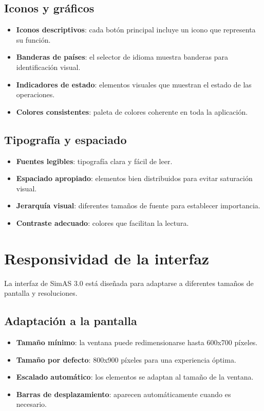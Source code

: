 \subsection{Iconos y gráficos}

\begin{itemize}
    \item \textbf{Iconos descriptivos}: cada botón principal incluye un icono que representa su función.
    \item \textbf{Banderas de países}: el selector de idioma muestra banderas para identificación visual.
    \item \textbf{Indicadores de estado}: elementos visuales que muestran el estado de las operaciones.
    \item \textbf{Colores consistentes}: paleta de colores coherente en toda la aplicación.
\end{itemize}

\subsection{Tipografía y espaciado}

\begin{itemize}
    \item \textbf{Fuentes legibles}: tipografía clara y fácil de leer.
    \item \textbf{Espaciado apropiado}: elementos bien distribuidos para evitar saturación visual.
    \item \textbf{Jerarquía visual}: diferentes tamaños de fuente para establecer importancia.
    \item \textbf{Contraste adecuado}: colores que facilitan la lectura.
\end{itemize}

\section{Responsividad de la interfaz}

La interfaz de SimAS 3.0 está diseñada para adaptarse a diferentes tamaños de pantalla y resoluciones.

\subsection{Adaptación a la pantalla}

\begin{itemize}
    \item \textbf{Tamaño mínimo}: la ventana puede redimensionarse hasta 600x700 píxeles.
    \item \textbf{Tamaño por defecto}: 800x900 píxeles para una experiencia óptima.
    \item \textbf{Escalado automático}: los elementos se adaptan al tamaño de la ventana.
    \item \textbf{Barras de desplazamiento}: aparecen automáticamente cuando es necesario.
\end{itemize}

